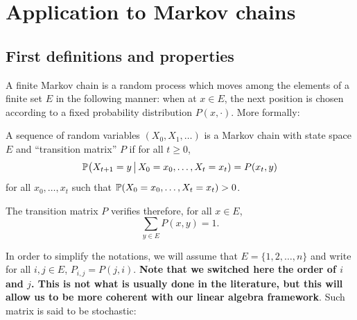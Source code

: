 \documentclass[11pt,nocut]{article}
\begin{document}


\section{Application to Markov chains}

\subsection{First definitions and properties}

A finite Markov chain is a random process which moves among the elements of a finite set $E$ in the following manner: when at $x \in E$, the next position is chosen according to a fixed probability distribution $P(x, \cdot)$. More formally:

\begin{definition}
	A sequence of random variables $(X_0, X_1, \dots)$ is a Markov chain with state space $E$ and ``transition matrix'' $P$ if for all $t \geq 0$, 
	$$
	\P\big( X_{t+1} = y \, \big| \, X_0= x_0, \dots, X_t = x_t ) = P(x_t,y)
	$$
	for all $x_0, \dots, x_t$ such that $\P(X_0 = x_0, \dots, X_t = x_t) >0$.
\end{definition}

The transition matrix $P$ verifies therefore, for all $x \in E$,
\begin{equation}
	\sum_{y \in E} P(x,y) = 1.
\end{equation}

In order to simplify the notations, we will assume that $E = \{1,2, \dots, n\}$ and write for all $i,j \in E$, $P_{i,j} = P(j,i)$. 
\textbf{Note that we switched here the order of $i$ and $j$. This is not what is usually done in the literature, but this will allow us to be more coherent with our linear algebra framework}.
Such matrix is said to be stochastic:
\end{document}
